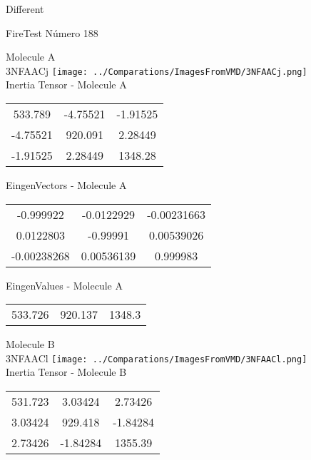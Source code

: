 \begin{center}
\vtab
\vtab
\textcolor{NavyBlue}{\Large Different}
\end{center}

 \newpage

\vtab[-2cm]
\begin{center}
{\large FireTest \tab Número 188}
\end{center}
\begin{multicols}{2}
\begin{center}

Molecule A \\ 
3NFAACj
\texttt{[image: ../Comparations/ImagesFromVMD/3NFAACj.png]}
\\
Inertia Tensor - Molecule A \\
\vtab

\begin{tabular}{|c c c|}
533.789	 & 	-4.75521	 & 	-1.91525	 \\
-4.75521	 & 	920.091	 & 	2.28449	 \\
-1.91525	 & 	2.28449	 & 	1348.28
\end{tabular}

\vtab
 EingenVectors - Molecule A     \\
\vtab
\begin{tabular}{|c c c|}
-0.999922	 & 	-0.0122929	 & 	-0.00231663	 \\
0.0122803	 & 	-0.99991	 & 	0.00539026	 \\
-0.00238268	 & 	0.00536139	 & 	0.999983
\end{tabular}

\vtab
 EingenValues - Molecule A     \\
\vtab
\begin{tabular}{|c c c|}
533.726	 & 	920.137	 & 	1348.3	 \\
\end{tabular}
\columnbreak

Molecule B \\ 
3NFAACl
\texttt{[image: ../Comparations/ImagesFromVMD/3NFAACl.png]}
\\
Inertia Tensor - Molecule B \\
\vtab

\begin{tabular}{|c c c|}
531.723	 & 	3.03424	 & 	2.73426	 \\
3.03424	 & 	929.418	 & 	-1.84284	 \\
2.73426	 & 	-1.84284	 & 	1355.39
\end{tabular}


\end{center}
\end{multicols}
